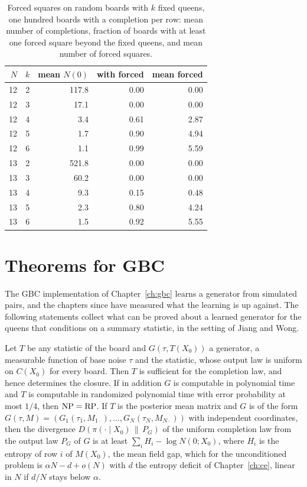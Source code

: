 \begin{table}[t]
\centering
\small
\caption{Forced squares on random boards with $k$ fixed queens, one hundred boards with a completion per row: mean number of completions, fraction of boards with at least one forced square beyond the fixed queens, and mean number of forced squares.}
\label{tab:closure}
\begin{tabular}{rrrrr}
\toprule
$N$ & $k$ & mean $N(0)$ & with forced & mean forced \\
\midrule
12 & 2 & 117.8 & 0.00 & 0.00 \\
12 & 3 & 17.1 & 0.00 & 0.00 \\
12 & 4 & 3.4 & 0.61 & 2.87 \\
12 & 5 & 1.7 & 0.90 & 4.94 \\
12 & 6 & 1.1 & 0.99 & 5.59 \\
13 & 2 & 521.8 & 0.00 & 0.00 \\
13 & 3 & 60.2 & 0.00 & 0.00 \\
13 & 4 & 9.3 & 0.15 & 0.48 \\
13 & 5 & 2.3 & 0.80 & 4.24 \\
13 & 6 & 1.5 & 0.92 & 5.55 \\
\bottomrule
\end{tabular}
\end{table}

\section{Theorems for GBC}

The GBC implementation of Chapter~\ref{ch:gbc} learns a generator from simulated pairs, and the chapters since have measured what the learning is up against. The following statements collect what can be proved about a learned generator for the queens that conditions on a summary statistic, in the setting of Jiang and Wong.

\begin{theorem}
\label{thm:gbcsuff}
Let $T$ be any statistic of the board and $G(\tau, T(X_0))$ a generator, a measurable function of base noise $\tau$ and the statistic, whose output law is uniform on $C(X_0)$ for every board. Then $T$ is sufficient for the completion law, and hence determines the closure. If in addition $G$ is computable in polynomial time and $T$ is computable in randomized polynomial time with error probability at most $1/4$, then $\mathrm{NP} = \mathrm{RP}$. If $T$ is the posterior mean matrix and $G$ is of the form $G(\tau, M) = (G_1(\tau_1, M_{1 \cdot}), \dots, G_N(\tau_N, M_{N \cdot}))$ with independent coordinates, then the divergence $D(\pi(\cdot \mid X_0) \,\|\, P_G)$ of the uniform completion law from the output law $P_G$ of $G$ is at least $\sum_i H_i - \log N(0; X_0)$, where $H_i$ is the entropy of row $i$ of $M(X_0)$, the mean field gap, which for the unconditioned problem is $\alpha N - d + o(N)$ with $d$ the entropy deficit of Chapter~\ref{ch:ce}, linear in $N$ if $d / N$ stays below $\alpha$.
\end{theorem}

